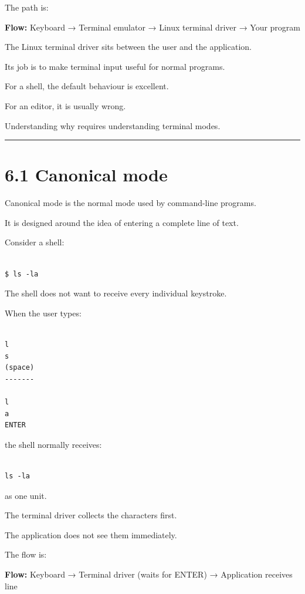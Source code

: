 \documentclass[
  oneside,
  openany]{book}
\begin{document}
The path is:

\textbf{Flow:} Keyboard → Terminal emulator → Linux terminal driver →
Your program

The Linux terminal driver sits between the user and the application.

Its job is to make terminal input useful for normal programs.

For a shell, the default behaviour is excellent.

For an editor, it is usually wrong.

Understanding why requires understanding terminal modes.

\begin{center}\rule{0.5\linewidth}{0.5pt}\end{center}

\hypertarget{canonical-mode}{%
\section{6.1 Canonical mode}\label{canonical-mode}}

Canonical mode is the normal mode used by command-line programs.

It is designed around the idea of entering a complete line of text.

Consider a shell:

\begin{verbatim}

$ ls -la
\end{verbatim}

The shell does not want to receive every individual keystroke.

When the user types:

\begin{verbatim}

l
s
(space)
-------

l
a
ENTER
\end{verbatim}

the shell normally receives:

\begin{verbatim}

ls -la
\end{verbatim}

as one unit.

The terminal driver collects the characters first.

The application does not see them immediately.

The flow is:

\textbf{Flow:} Keyboard → Terminal driver (waits for ENTER) →
Application receives line
\end{document}
